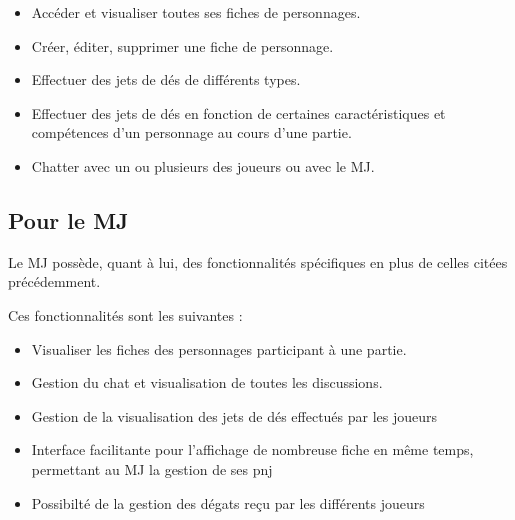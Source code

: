 \documentclass[11pt,a4paper]{article}
\begin{document}
\begin{itemize}
  \item Accéder et visualiser toutes ses fiches de personnages.
  \item Créer, éditer, supprimer une fiche de personnage.
  \item Effectuer des jets de dés de différents types.
  \item Effectuer des jets de dés en fonction de certaines caractéristiques et
  compétences d'un personnage au cours d'une partie.
  \item Chatter avec un ou plusieurs des joueurs ou avec le MJ.
\end{itemize}

\subsection{Pour le MJ}
Le MJ possède, quant à lui, des fonctionnalités spécifiques en plus de celles
citées précédemment.

Ces fonctionnalités sont les suivantes :

\begin{itemize}
  \item Visualiser les fiches des personnages participant à une partie.
  \item Gestion du chat et visualisation de toutes les discussions.
\item Gestion de la visualisation des jets de dés effectués par les joueurs
\item Interface facilitante pour l'affichage de nombreuse fiche en même temps, permettant au MJ la gestion de ses pnj 
\item Possibilté de la gestion des dégats reçu par les différents joueurs
\end{itemize}

\clearpage
  
\end{document}
